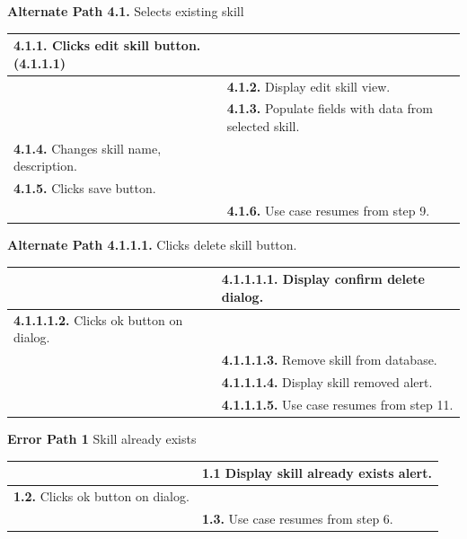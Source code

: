 \documentclass[letterpaper,12pt]{report}
\begin{document}
{\begin{center}
\begin{tabular}{| p{8.5cm} | p{8.5cm} |}
\end{tabular}
\end{center}
\pagebreak
\centering \textbf{Alternate Path 4.1.}
\linebreak Selects existing skill
\begin{center}
\xuchead
\begin{tabular}{| p{8.5cm} | p{8.5cm} |}
\hline
\textbf{4.1.1.} Clicks edit skill button. (4.1.1.1) & \\
\hline
& \textbf{4.1.2.} Display edit skill view. \\
\hline
& \textbf{4.1.3.} Populate fields with data from selected skill. \\
\hline
\textbf{4.1.4.} Changes skill name, description. &\\
\hline
\textbf{4.1.5.} Clicks save button. &\\
\hline
& \textbf{4.1.6.} Use case resumes from step 9. \\
\hline
\end{tabular}
\end{center}
\pagebreak
\centering \textbf{Alternate Path 4.1.1.1.}
\linebreak Clicks delete skill button.
\begin{center}
\xuchead
\begin{tabular}{| p{8.5cm} | p{8.5cm} |}
\hline
& \textbf{4.1.1.1.1.} Display confirm delete dialog. \\
\hline
\textbf{4.1.1.1.2.} Clicks ok button on dialog. & \\
\hline
& \textbf{4.1.1.1.3.} Remove skill from database. \\
\hline
& \textbf{4.1.1.1.4.} Display skill removed alert. \\
\hline
& \textbf{4.1.1.1.5.} Use case resumes from step 11. \\
\hline
\end{tabular}
\end{center}
\centering \textbf{Error Path 1}
\linebreak Skill already exists
\begin{center}
\xuchead
\begin{tabular}{| p{8.5cm} | p{8.5cm} |}
\hline
& \textbf{1.1} Display skill already exists alert. \\
\hline
\textbf{1.2.} Clicks ok button on dialog. & \\
\hline
& \textbf{1.3.} Use case resumes from step 6. \\
\hline
\end{tabular}
\end{center}

}
\end{document}
